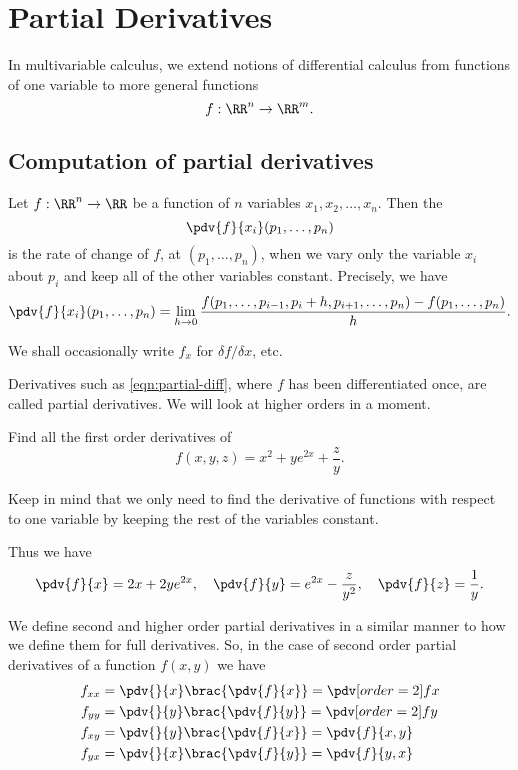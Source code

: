 \chapter{Partial Derivatives}
In multivariable calculus, we extend notions of differential calculus from functions of one variable to more general functions
\[ f:\RR^n\to\RR^m. \]

\section{Computation of partial derivatives}
Let $f:\RR^n\to\RR$ be a function of $n$ variables $x_1,x_2,\dots,x_n$. Then the 
\[ \pdv{f}{x_i}(p_1,\dots,p_n) \]
is the rate of change of $f$, at $(p_1,\dots,p_n)$, when we vary only the variable $x_i$ about $p_i$ and keep all of the other variables constant. Precisely, we have
\begin{equation}\label{eqn:partial-diff}
\pdv{f}{x_i}(p_1,\dots,p_n)=\lim_{h\to0}\frac{f(p_1,\dots,p_{i-1},p_i+h,p_{i+1},\dots,p_n)-f(p_1,\dots,p_n)}{h}.
\end{equation}

\begin{notation}
We shall occasionally write $f_x$ for $\delta f/\delta x$, etc.
\end{notation}

Derivatives such as \cref{eqn:partial-diff}, where $f$ has been differentiated once, are called  partial derivatives. We will look at higher orders in a moment.

\begin{exercise}
Find all the first order derivatives of
\[ f(x,y,z)=x^2+ye^{2x}+\frac{z}{y}. \]
\end{exercise}

\begin{solution}
Keep in mind that we only need to find the derivative of functions with respect to one variable by keeping the rest of the variables constant.

Thus we have
\[ \pdv{f}{x}=2x+2ye^{2x}, \quad \pdv{f}{y}=e^{2x}-\frac{z}{y^2}, \quad \pdv{f}{z}=\frac{1}{y}. \]
\end{solution}

We define second and higher order partial derivatives in a similar manner to how we define them for full derivatives. So, in the case of second order partial derivatives of a function $f(x,y)$ we have
\[ \begin{split}
f_{xx} &= \pdv{}{x}\brac{\pdv{f}{x}} = \pdv[order={2}]{f}{x} \\
f_{yy} &= \pdv{}{y}\brac{\pdv{f}{y}} = \pdv[order={2}]{f}{y} \\
f_{xy} &= \pdv{}{y}\brac{\pdv{f}{x}} = \pdv{f}{x,y} \\
f_{yx} &= \pdv{}{x}\brac{\pdv{f}{y}} = \pdv{f}{y,x}
\end{split} \]

